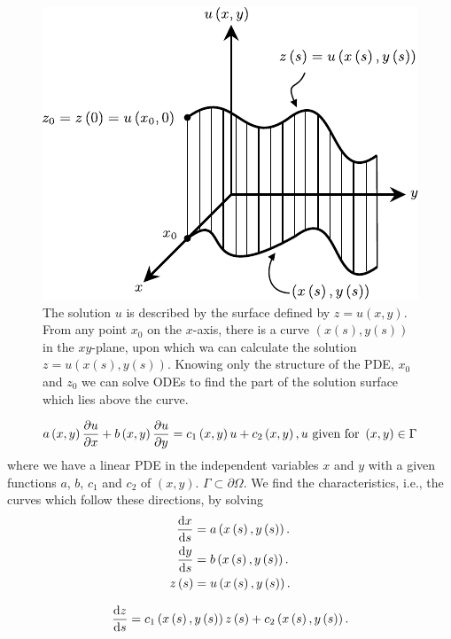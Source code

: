 \begin{figure}[ht!]
	\centering
	\includegraphics[width=0.35\paperwidth]{characteristics}
	\caption{The solution $u$ is described by the surface defined by
		$z=u\left(x,y\right)$.
		From any point $x_{0}$ on the $x$-axis, there is a curve
		$\left(x\left(s\right),y\left(s\right)\right)$ in the
		$xy$-plane, upon which wa can calculate the solution
		$z=u\left(x\left(s\right),y\left(s\right)\right)$.
		Knowing only the structure of the PDE, $x_{0}$ and $z_{0}$ we
		can solve ODEs to find the part of the solution surface which
		lies above the curve.}
\end{figure}

\begin{equation*}
	a\left(x,y\right)\diffp{u}{x}+
	b\left(x,y\right)\diffp{u}{y}=
	c_{1}\left(x,y\right)u+
	c_{2}\left(x,y\right),
	u\text{ given for }\left(x,y\right)\in\Gamma
\end{equation*}
where we have a linear PDE in the independent variables $x$ and $y$
with a given functions $a$, $b$, $c_{1}$ and $c_{2}$ of $\left(x,y\right)$.
$\Gamma\subset\partial\Omega$.
We find the characteristics, i.e., the curves which follow these directions, by solving
\begin{align*}
	\diff{x}{s}     & =
	a\left(x\left(s\right),y\left(s\right)\right). \\
	\diff{y}{s}     & =
	b\left(x\left(s\right),y\left(s\right)\right). \\
	z\left(s\right) & =
	u\left(x\left(s\right),y\left(s\right)\right).
\end{align*}

\begin{equation*}
	\diff{z}{s}=
	c_{1}\left(x\left(s\right),y\left(s\right)\right)
	z\left(s\right)+
	c_{2}\left(x\left(s\right),y\left(s\right)\right).
\end{equation*}

